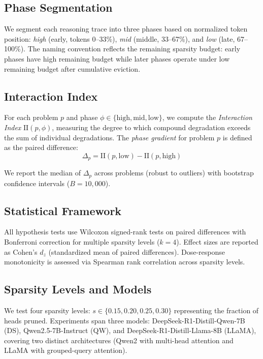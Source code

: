 \documentclass[11pt]{article}
\begin{document}
\subsection{Phase Segmentation}

We segment each reasoning trace into three phases based on normalized token position: \textit{high} (early, tokens 0--33\%), \textit{mid} (middle, 33--67\%), and \textit{low} (late, 67--100\%). The naming convention reflects the remaining sparsity budget: early phases have high remaining budget while later phases operate under low remaining budget after cumulative eviction.

\subsection{Interaction Index}

For each problem $p$ and phase $\phi \in \{\text{high}, \text{mid}, \text{low}\}$, we compute the \emph{Interaction Index} $\text{II}(p, \phi)$, measuring the degree to which compound degradation exceeds the sum of individual degradations. The \emph{phase gradient} for problem $p$ is defined as the paired difference:
\begin{equation}
    \Delta_p = \text{II}(p, \text{low}) - \text{II}(p, \text{high})
\end{equation}

We report the median of $\Delta_p$ across problems (robust to outliers) with bootstrap confidence intervals ($B=10{,}000$).

\subsection{Statistical Framework}

All hypothesis tests use Wilcoxon signed-rank tests on paired differences with Bonferroni correction for multiple sparsity levels ($k=4$). Effect sizes are reported as Cohen's $d_z$ (standardized mean of paired differences). Dose-response monotonicity is assessed via Spearman rank correlation across sparsity levels.

\subsection{Sparsity Levels and Models}

We test four sparsity levels: $s \in \{0.15, 0.20, 0.25, 0.30\}$ representing the fraction of heads pruned. Experiments span three models: DeepSeek-R1-Distill-Qwen-7B (DS), Qwen2.5-7B-Instruct (QW), and DeepSeek-R1-Distill-Llama-8B (LLaMA), covering two distinct architectures (Qwen2 with multi-head attention and LLaMA with grouped-query attention).
\end{document}
